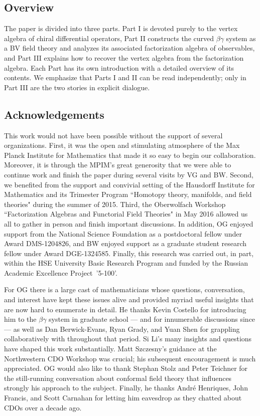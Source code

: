 \subsection{Overview}

The paper is divided into three parts. Part I is devoted purely to the vertex algebra of chiral differential operators, Part II constructs the curved $\beta\gamma$ system as a BV field theory and analyzes its associated factorization algebra of observables, and Part III explains how to recover the vertex algebra from the factorization algebra. Each Part has its own introduction with a detailed overview of its contents. We emphasize that Parts I and II can be read independently; only in Part III are the two stories in explicit dialogue.

\subsection{Acknowledgements}

This work would not have been possible without the support of several organizations.
First, it was the open and stimulating atmosphere of the Max Planck Institute for Mathematics 
that made it so easy to begin our collaboration.
Moreover, it is through the MPIM's great generosity that we were able to continue
work and finish the paper during several visits by VG and BW.
Second, we benefited from the support and convivial setting of the Hausdorff Institute for Mathematics
and its Trimester Program ``Homotopy theory, manifolds, and field theories" during the summer of 2015.
Third, the Oberwolfach Workshop ``Factorization Algebras and Functorial Field Theories" in May 2016
allowed us all to gather in person and finish important discussions.
In addition, OG enjoyed support from the National Science Foundation as a postdoctoral fellow under Award DMS-1204826, 
and BW enjoyed support as a graduate student research fellow under Award DGE-1324585.  
Finally, this research was carried out, in part, within the HSE University Basic Research Program
and funded by the Russian Academic Excellence Project~'5-100'.

For OG there is a large cast of mathematicians whose questions, conversation, and interest 
have kept these issues alive and provided myriad useful insights that are now hard to enumerate in detail.
He thanks Kevin Costello for introducing him to the $\beta\gamma$ system in graduate school --- and for innumerable discussions since --- as well as Dan Berwick-Evans, Ryan Grady, and Yuan Shen
for grappling collaboratively with \cite{WG2} throughout that period.
Si Li's many insights and questions have shaped this work substantially.
Matt Szczesny's guidance at the Northwestern CDO Workshop was crucial; 
his subsequent encouragement is much appreciated.
OG would also like to thank Stephan Stolz and Peter Teichner for the still-running conversation about
conformal field theory that influences strongly his approach to the subject.
Finally, he thanks Andr\'e Henriques, John Francis, and Scott Carnahan for letting him eavesdrop as they chatted about CDOs over a decade ago.

